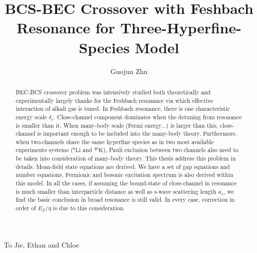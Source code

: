 \documentclass[edeposit,fullpage]{uiucthesis2009}
\begin{document}
\title{BCS-BEC Crossover with Feshbach Resonance for Three-Hyperfine-Species Model}
\author{Guojun Zhu}
\phdthesis
{}
\maketitle

\frontmatter

\begin{abstract}
BEC-BCS crossover problem was intensively studied both theoretically and experimentally largely thanks for the Feshbach resonance via which effective interaction of alkali gas is tuned.  In Feshbach resonance, there is one characteristic energy scale $\delta_c$. Close-channel component dominates when the detuning from resonance is smaller than it.  When many-body scale (Fermi energy...) is larger than this, close-channel is important enough to be included into the many-body theory.  Furthermore, when two-channels share the same hyperfine species as in two most available experiments systems (${}^6\text{Li}$ and ${}^{40}\text{K}$), Pauli exclusion between two channels also need to be taken into consideration of many-body theory.  This thesis address this problem in details.  Mean-field state equations  are derived. We have a set of gap equations and number equations.  Fermionic and bosonic excitation spectrum is also derived within this model.  In all the cases, if assuming the bound-state of close-channel in resonance is much smaller than interparticle distance as well as s-wave scattering length $a_s$, we find the basic conclusion in broad resonance is still valid. In every case, correction in order of $E_F/\eta$ is due to this consideration.  
\end{abstract}

\begin{dedication}
To Jie, Ethan and Chloe
\end{dedication}
\end{document}
